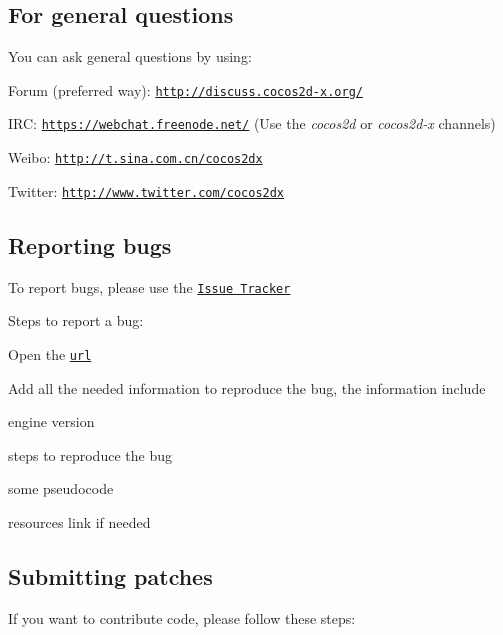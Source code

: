\subsection*{For general questions}

You can ask general questions by using\+:


\begin{DoxyItemize}
\item Forum (preferred way)\+: \href{http://discuss.cocos2d-x.org/}{\tt http\+://discuss.\+cocos2d-\/x.\+org/}
\item I\+RC\+: \href{https://webchat.freenode.net/}{\tt https\+://webchat.\+freenode.\+net/} (Use the {\itshape cocos2d} or {\itshape cocos2d-\/x} channels)
\item Weibo\+: \href{http://t.sina.com.cn/cocos2dx}{\tt http\+://t.\+sina.\+com.\+cn/cocos2dx}
\item Twitter\+: \href{http://www.twitter.com/cocos2dx}{\tt http\+://www.\+twitter.\+com/cocos2dx}
\end{DoxyItemize}

\subsection*{Reporting bugs}

To report bugs, please use the \href{https://github.com/cocos2d/cocos2d-x/issues}{\tt Issue Tracker}

Steps to report a bug\+:
\begin{DoxyItemize}
\item Open the \href{https://github.com/cocos2d/cocos2d-x/issues/new}{\tt url}
\item Add all the needed information to reproduce the bug, the information include
\begin{DoxyItemize}
\item engine version
\item steps to reproduce the bug
\item some pseudocode
\item resources link if needed
\end{DoxyItemize}
\end{DoxyItemize}

\subsection*{Submitting patches}

If you want to contribute code, please follow these steps\+:


